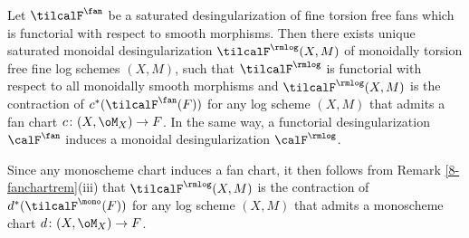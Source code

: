 \documentclass[10pt]{../fichiers-configuration-latex/smfart}
\begin{document}
\begin{theorem2}\label{8-monoidaldesth} Let $\tilcalF^\fan$ be a
saturated desingularization of fine torsion free fans which is
functorial with respect to smooth morphisms. Then there exists
unique saturated monoidal desingularization $\tilcalF^\rmlog(X,M)$
of monoidally torsion free fine log schemes $(X,M)$, such that
$\tilcalF^\rmlog$ is functorial with respect to all monoidally
smooth morphisms and $\tilcalF^\rmlog(X,M)$ is the contraction of
$c^*(\tilcalF^\fan(F))$ for any log scheme $(X,M)$ that admits a
fan chart $c{\colon}(X,\oM_X)\to F$. In the same way, a functorial
desingularization $\calF^\fan$ induces a monoidal desingularization
$\calF^\rmlog$.  \end{theorem2}

\begin{remark2}\label{8-monoidaldesrem} Since any monoscheme
chart induces a fan chart, it then follows from Remark
\ref{8-fanchartrem}(iii) that $\tilcalF^\rmlog(X,M)$ is the
contraction of $d^*(\tilcalF^\mono(F))$ for any log scheme
$(X,M)$ that admits a monoscheme chart $d{\colon}(X,\oM_X)\to F$.
\end{remark2}
\end{document}
